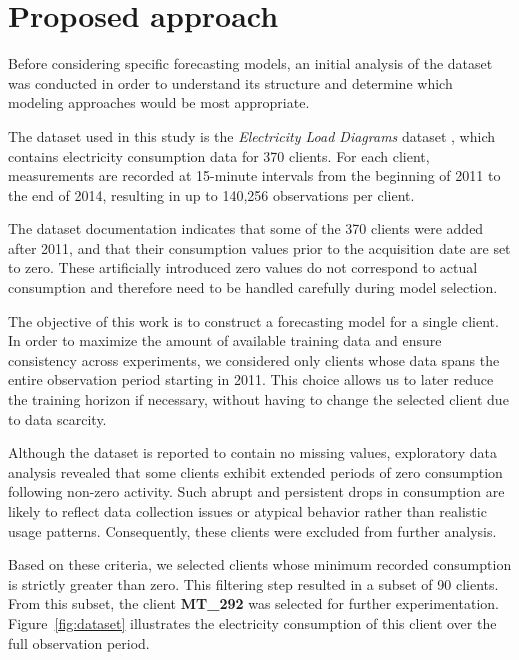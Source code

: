 \section{Proposed approach}

Before considering specific forecasting models, an initial analysis of the dataset was conducted in order to understand its structure and determine which modeling approaches would be most appropriate.

\par
The dataset used in this study is the \textit{Electricity Load Diagrams} dataset \cite{electricityloaddiagrams20112014_321}, which contains electricity consumption data for 370 clients. For each client, measurements are recorded at 15-minute intervals from the beginning of 2011 to the end of 2014, resulting in up to 140{,}256 observations per client.

\par
The dataset documentation indicates that some of the 370 clients were added after 2011, and that their consumption values prior to the acquisition date are set to zero. These artificially introduced zero values do not correspond to actual consumption and therefore need to be handled carefully during model selection.

\par
The objective of this work is to construct a forecasting model for a single client. In order to maximize the amount of available training data and ensure consistency across experiments, we considered only clients whose data spans the entire observation period starting in 2011. This choice allows us to later reduce the training horizon if necessary, without having to change the selected client due to data scarcity.

\par
Although the dataset is reported to contain no missing values, exploratory data analysis revealed that some clients exhibit extended periods of zero consumption following non-zero activity. Such abrupt and persistent drops in consumption are likely to reflect data collection issues or atypical behavior rather than realistic usage patterns. Consequently, these clients were excluded from further analysis.

\par
Based on these criteria, we selected clients whose minimum recorded consumption is strictly greater than zero. This filtering step resulted in a subset of 90 clients. From this subset, the client \textbf{MT\_292} was selected for further experimentation. Figure~\ref{fig:dataset} illustrates the electricity consumption of this client over the full observation period.

